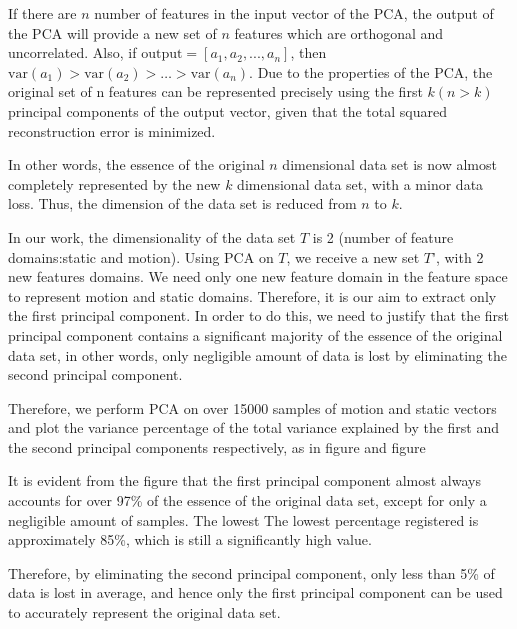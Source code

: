 If there are $n$ number of features in the input vector of the PCA, the output of the
PCA will provide a new set of $n$ features which are orthogonal and uncorrelated. Also, if
$\mathrm{output} =[a_{1}, a_{2}, ..., a_{n}]$, then $\mathrm{var}(a_{1})> \mathrm{var}(a_{2})> \dots> \mathrm{var}(a_{n})$.
Due to the properties of the PCA, the original set of n features can be
represented precisely using the first $k(n>k)$ principal
components of the output vector, given that the total squared reconstruction error
is minimized.

In other words, the essence of the original $n$ dimensional data set is now almost
completely represented by the new $k$ dimensional data set, with a minor data loss. Thus, the
dimension of the data set is reduced from $n$ to $k$.


In our work, the dimensionality of the data set $T$ is 2 (number of feature domains:static
and motion).
Using PCA on $T$, we receive a new set $T’$, with 2 new features domains. We need only one new feature
domain in the feature space to
represent motion and static domains. Therefore, it is our aim to extract only the first principal component.
In order to do this, we need to justify that the first principal component contains a significant majority of
the essence of the original data set, in other words, only negligible amount of data is lost by
eliminating the second principal component.

Therefore, we perform PCA on over 15000 samples of motion and static
vectors and plot the variance percentage of the total variance
explained by the first and the second principal components respectively, as in figure and figure


It is evident from the figure that the first principal component almost always accounts
for over 97\% of the essence of the original data set, except for only a negligible amount
of samples. The lowest The lowest percentage registered is approximately 85\%, which is still a
significantly high value.

Therefore, by eliminating the second principal component, only less than 5\% of data
is lost in average, and hence only the first principal component can be used to accurately
represent the original data set. 